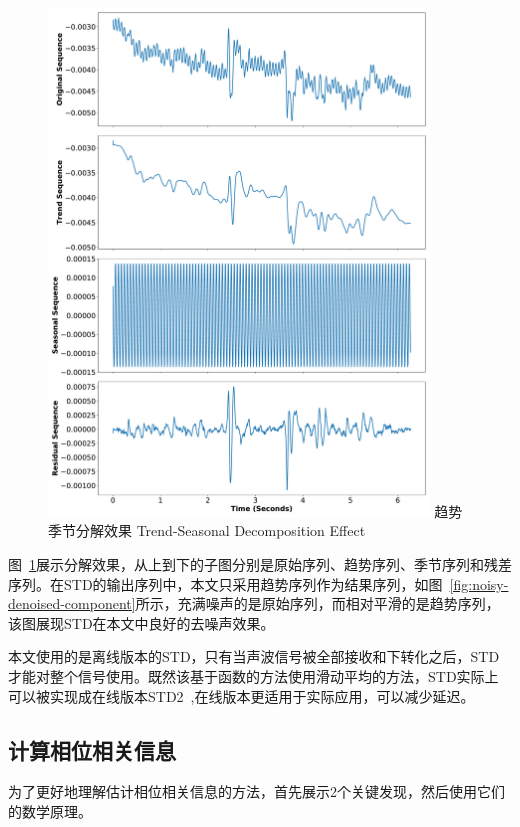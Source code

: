 \begin{figure}[!htp]
  \centering
  \includegraphics[width=0.9\textwidth]{figure/std-effect.pdf}
  \bicaption
    {趋势季节分解效果}
    {Trend-Seasonal Decomposition Effect}
  \label{fig:trend-seasonal-decomposition-effect}
\end{figure}
图~\ref{fig:trend-seasonal-decomposition-effect}展示分解效果，从上到下的子图分别是原始序列、趋势序列、季节序列和残差序列。在STD的输出序列中，本文只采用趋势序列作为结果序列，如图~\ref{fig:noisy-denoised-component}所示，充满噪声的是原始序列，而相对平滑的是趋势序列，该图展现STD在本文中良好的去噪声效果。

本文使用的是离线版本的STD，只有当声波信号被全部接收和下转化之后，STD才能对整个信号使用。既然该基于函数的方法使用滑动平均的方法，STD实际上可以被实现成在线版本STD2~\cite{std2},在线版本更适用于实际应用，可以减少延迟。

\subsection{计算相位相关信息}
为了更好地理解估计相位相关信息的方法，首先展示2个关键发现，然后使用它们的数学原理。

